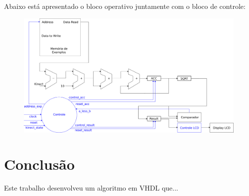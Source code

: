 \documentclass[12pt]{article}
\begin{document}
\newpage

Abaixo está apresentado o bloco operativo juntamente com o bloco de controle:

\begin{figure}[!ht]
\centering
\includegraphics[scale=0.36]{img/circuito_knn.png}
\end{figure}



\section{Conclus\~ao}\label{sec:figs}

Este trabalho desenvolveu um algoritmo em VHDL que...









\end{document}
